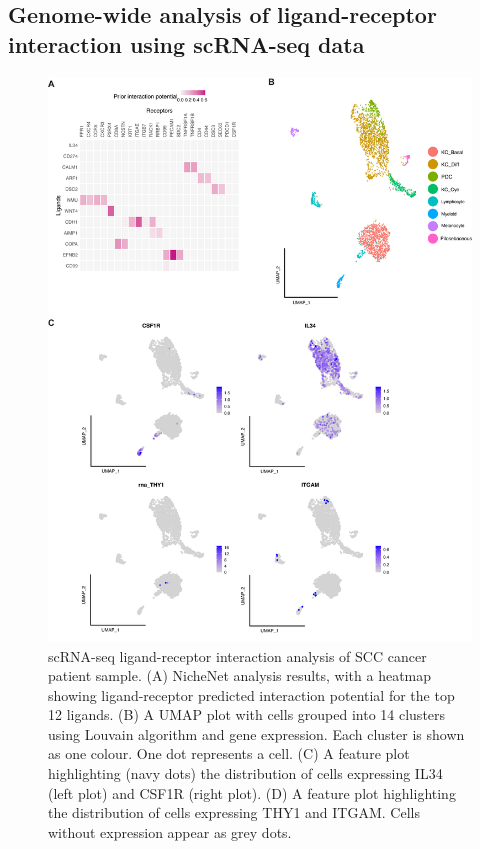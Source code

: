 \subsection{Genome-wide analysis of ligand-receptor interaction using scRNA-seq data}
\begin{figure}[htp]
\renewcommand{\figurename}{Figure}
    \centering
    \includegraphics[width=0.75\columnwidth]{Chapter2/Figures/Supplemental_Fig_S2.png}
    \caption[scRNA-seq ligand-receptor interaction analysis of SCC cancer patient sample. ]{scRNA-seq ligand-receptor interaction analysis of SCC cancer patient sample. (A) NicheNet analysis results, with a heatmap showing ligand-receptor predicted interaction potential for the top 12 ligands. (B) A UMAP plot with cells grouped into 14 clusters using Louvain algorithm and gene expression. Each cluster is shown as one colour. One dot represents a cell. (C) A feature plot highlighting (navy dots) the distribution of cells expressing IL34 (left plot) and CSF1R (right plot). (D) A feature plot highlighting the distribution of cells expressing THY1 and ITGAM. Cells without expression appear as grey dots.}
    \label{fig:Chap2_Supfigure2}
\end{figure}

